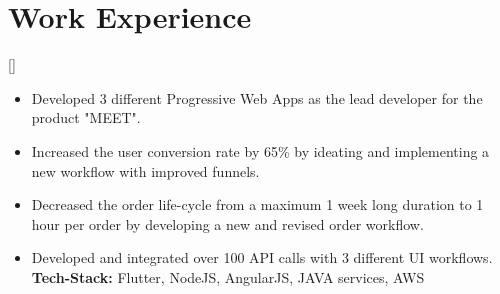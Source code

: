 \documentclass{article}
\begin{document}
\section{Work Experience}

[]
\begin{itemize}
    \item Developed 3 different Progressive Web Apps as the lead developer for the product "MEET".
    \item Increased the user conversion rate by 65\% by ideating and implementing a new workflow with improved funnels.
    \item Decreased the order life-cycle from a maximum 1 week long duration to 1 hour per order by developing a new and revised order workflow.
    \item Developed and integrated over 100 API calls with 3 different UI workflows.\\
\textbf{Tech-Stack:} Flutter, NodeJS, AngularJS, JAVA services, AWS 

\end{itemize}



\end{document}
